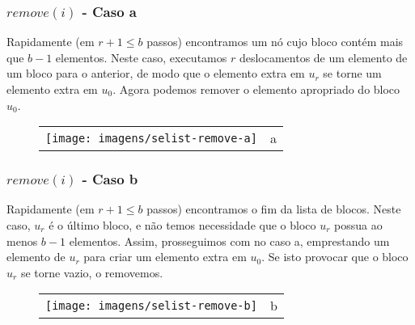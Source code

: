 \documentclass{beamer}
\begin{document}
\begin{frame}[shrink]
\frametitle{$remove(i)$ - Caso a}
Rapidamente (em $ r+1\le \ensuremath{\ensuremath{\ensuremath{\mathit{b}}}}$ passos) encontramos um nó cujo bloco contém mais que $ \ensuremath{\ensuremath{\ensuremath{\mathit{b}}}}-1$ elementos. Neste caso, executamos $ r$ deslocamentos de um elemento de um bloco para o anterior, de modo que o elemento extra em $ \ensuremath{\ensuremath{\ensuremath{\mathit{u}}}}_r$ se torne um elemento extra em $ \ensuremath{\ensuremath{\ensuremath{\mathit{u}}}}_0$. Agora podemos remover o elemento apropriado do bloco $ \ensuremath{\ensuremath{\ensuremath{\mathit{u}}}}_0$.
\begin{figure}
  \noindent
  \begin{center}
    \begin{tabular}{lc}
      \texttt{[image: imagens/selist-remove-a]}& a\\[4ex]
    \end{tabular}
  \end{center}
\end{figure}
\end{frame}

\begin{frame}[shrink]
\frametitle{$remove(i)$ - Caso b}
Rapidamente (em $ r+1\le \ensuremath{\ensuremath{\ensuremath{\mathit{b}}}}$ passos) encontramos o fim da lista de blocos. Neste caso, $ \ensuremath{\ensuremath{\ensuremath{\mathit{u}}}}_r$ é o último bloco, e não temos necessidade que o bloco $ \ensuremath{\ensuremath{\ensuremath{\mathit{u}}}}_r$ possua ao menos $ \ensuremath{\ensuremath{\ensuremath{\mathit{b}}}}-1$ elementos. Assim, prosseguimos com no caso a, emprestando um elemento de  $ \ensuremath{\ensuremath{\ensuremath{\mathit{u}}}}_r$ para criar um elemento extra em $ \ensuremath{\ensuremath{\ensuremath{\mathit{u}}}}_0$. Se isto provocar que o bloco $ \ensuremath{\ensuremath{\ensuremath{\mathit{u}}}}_r$ se torne vazio, o removemos. 
\begin{figure}
  \noindent
  \begin{center}
    \begin{tabular}{lc}
      \texttt{[image: imagens/selist-remove-b]}& b\\[4ex]
    \end{tabular}
  \end{center}
\end{figure}
\end{frame}
\end{document}
